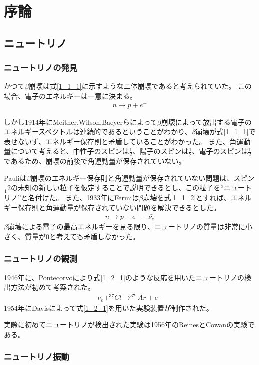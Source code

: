 \chapter{序論}
\section{ニュートリノ}																		%
\subsection{ニュートリノの発見}																%
かつて$\beta$崩壊は式\ref{1_1_1}に示すような二体崩壊であると考えられていた。
この場合、電子のエネルギーは一意に決まる。
\begin{align}
	n\to p+e^-\label{1_1_1}
\end{align}
\par
しかし1914年にMeitner,Wilson,Baeyerらによって$\beta$崩壊によって放出する電子のエネルギースペクトルは連続的であるということがわかり、$\beta$崩壊が式\ref{1_1_1}で表せないず、エネルギー保存則と矛盾していることがわかった。
また、角運動量について考えると、中性子のスピンは$\tfrac{1}{2}$、陽子のスピンは$\tfrac{1}{2}$、電子のスピンは$\tfrac{1}{2}$であるため、崩壊の前後で角運動量が保存されていない。
\par
Pauliは$\beta$崩壊のエネルギー保存則と角運動量が保存されていない問題は、スピン$\tfrac{}1{2}$の未知の新しい粒子を仮定することで説明できるとし、この粒子を``ニュートリノ''と名付けた。
また、1933年にFermiは$\beta$崩壊を式\ref{1_1_2}とすれば、エネルギー保存則と角運動量が保存されていない問題を解決できるとした。
\begin{align}
	n\to p+e^- +\bar{\nu_e} \label{1_1_2}
\end{align}
$\beta$崩壊による電子の最高エネルギーを見る限り、ニュートリノの質量は非常に小さく、質量が0と考えても矛盾しなかった。
\subsection{ニュートリノの観測}%
1946年に、Pontecorvoにより式\ref{1_2_1}のような反応を用いたニュートリノの検出方法が初めて考案された。
\begin{align}
	\nu_e+^{37}Cl \to ^{37}Ar+e^- \label{1_2_1}
\end{align}
1954年にDavisによって式\ref{1_2_1}を用いた実験装置が制作された。
\par
実際に初めてニュートリノが検出された実験は1956年のReinesとCowanの実験である。

\subsection{ニュートリノ振動}																	%
